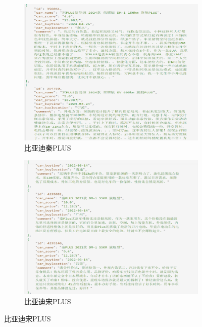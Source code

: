 \documentclass[UTF8,a4paper,15pt,titlepage,oneside]{ctexbook}
\begin{document}
\begin{figure}[htbp]
  \centering
  
  \begin{subfigure}{0.32\textwidth}
    \includegraphics[width=\linewidth]{pictures/49.png}
    \caption{比亚迪秦PLUS}
  \end{subfigure}
  \begin{subfigure}{0.32\textwidth}
    \includegraphics[width=\linewidth]{pictures/50.png}
    \caption{比亚迪宋PLUS}
  \end{subfigure}

  \end{figure}
\end{document}
